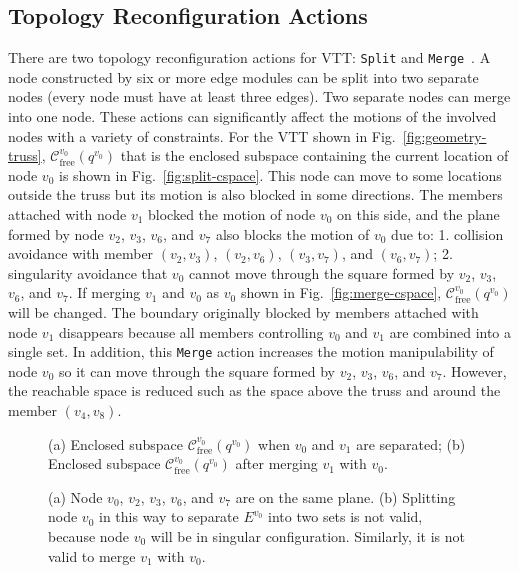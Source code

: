 \documentclass[journal]{IEEEtran}
\begin{document}
\subsection{Topology Reconfiguration Actions}
\label{sec:topology-action}

There are two topology reconfiguration actions for VTT: \texttt{Split}
and \texttt{Merge}~\cite{Spinos-vtt-iros-2017}. A node constructed by
six or more edge modules can be split into two separate nodes (every
node must have at least three edges). Two separate nodes can merge
into one node. These actions can significantly affect the motions of
the involved nodes with a variety of constraints. For the VTT shown in
Fig.~\ref{fig:geometry-truss},
$\mathcal{C}_{\mathrm{free}}^{v_0}(q^{v_0})$ that is the enclosed
subspace containing the current location of node $v_0$ is shown in
Fig.~\ref{fig:split-cspace}. This node can move to some locations
outside the truss but its motion is also blocked in some
directions. The members attached with node $v_1$ blocked the motion of
node $v_0$ on this side, and the plane formed by node $v_2$, $v_3$,
$v_6$, and $v_7$ also blocks the motion of $v_0$ due to: 1. collision
avoidance with member $(v_2,v_3)$, $(v_2,v_6)$, $(v_3,v_7)$, and
$(v_6,v_7)$; 2. singularity avoidance that $v_0$ cannot move through
the square formed by $v_2$, $v_3$, $v_6$, and $v_7$. If merging $v_1$
and $v_0$ as $v_0$ shown in Fig.~\ref{fig:merge-cspace},
$\mathcal{C}_{\mathrm{free}}^{v_0}(q^{v_0})$ will be changed. The
boundary originally blocked by members attached with node $v_1$
disappears because all members controlling $v_0$ and $v_1$ are
combined into a single set. In addition, this \texttt{Merge} action
increases the motion manipulability of node $v_0$ so it can move
through the square formed by $v_2$, $v_3$, $v_6$, and $v_7$. However,
the reachable space is reduced such as the space above the truss and
around the member $(v_4, v_8)$.

\begin{figure}[t]
  \centering
  \hfil
  \caption{(a) Enclosed subspace
    $\mathcal{C}_{\mathrm{free}}^{v_0}(q^{v_0})$ when $v_0$ and $v_1$
    are separated; (b) Enclosed subspace
    $\mathcal{C}_{\mathrm{free}}^{v_0}(q^{v_0})$ after merging $v_1$
    with $v_0$.}
\end{figure}

\begin{figure}[t]
  \centering
  \hfil
  \caption{(a) Node $v_0$, $v_2$, $v_3$, $v_6$, and $v_7$ are on the
    same plane. (b) Splitting node $v_0$ in this way to separate
    $E^{v_0}$ into two sets is not valid, because node $v_0$ will be
    in singular configuration. Similarly, it is not valid to merge
    $v_1$ with $v_0$.}
  \label{fig:topology-singular}
\end{figure}
\end{document}
